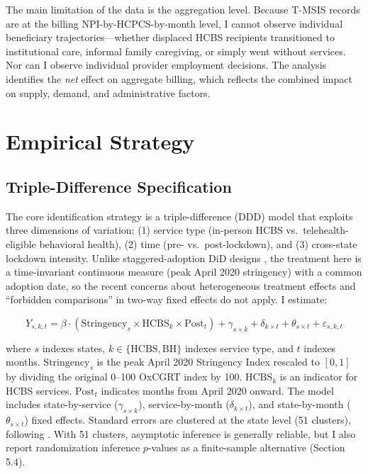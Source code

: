 \documentclass[12pt]{article}
\begin{document}
The main limitation of the data is the aggregation level. Because T-MSIS records are at the billing NPI-by-HCPCS-by-month level, I cannot observe individual beneficiary trajectories---whether displaced HCBS recipients transitioned to institutional care, informal family caregiving, or simply went without services. Nor can I observe individual provider employment decisions. The analysis identifies the \textit{net} effect on aggregate billing, which reflects the combined impact on supply, demand, and administrative factors.


\section{Empirical Strategy}

\subsection{Triple-Difference Specification}

The core identification strategy is a triple-difference (DDD) model that exploits three dimensions of variation: (1) service type (in-person HCBS vs.\ telehealth-eligible behavioral health), (2) time (pre- vs.\ post-lockdown), and (3) cross-state lockdown intensity. Unlike staggered-adoption DiD designs \citep{goodman2021difference, callaway2021, sun2021}, the treatment here is a time-invariant continuous measure (peak April 2020 stringency) with a common adoption date, so the recent concerns about heterogeneous treatment effects and ``forbidden comparisons'' in two-way fixed effects do not apply. I estimate:

\begin{equation}
Y_{s,k,t} = \beta \cdot (\text{Stringency}_s \times \text{HCBS}_k \times \text{Post}_t) + \gamma_{s \times k} + \delta_{k \times t} + \theta_{s \times t} + \varepsilon_{s,k,t}
\label{eq:ddd}
\end{equation}

\noindent where $s$ indexes states, $k \in \{\text{HCBS}, \text{BH}\}$ indexes service type, and $t$ indexes months. $\text{Stringency}_s$ is the peak April 2020 Stringency Index rescaled to $[0,1]$ by dividing the original 0--100 OxCGRT index by 100. $\text{HCBS}_k$ is an indicator for HCBS services. $\text{Post}_t$ indicates months from April 2020 onward. The model includes state-by-service ($\gamma_{s \times k}$), service-by-month ($\delta_{k \times t}$), and state-by-month ($\theta_{s \times t}$) fixed effects. Standard errors are clustered at the state level (51 clusters), following \citet{cameron2008bootstrap}. With 51 clusters, asymptotic inference is generally reliable, but I also report randomization inference $p$-values as a finite-sample alternative (Section 5.4).
\end{document}
